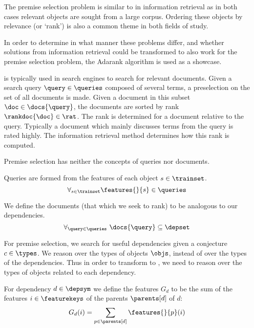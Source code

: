 The premise selection problem is similar to \ltr in information retrieval
as in both cases relevant objects are sought from a large corpus.
Ordering these objects by relevance (or `rank') is also a common theme in both fields of study.

In order to determine in what manner these problems differ, and whether solutions
from information retrieval could be transformed to also work for the premise selection problem,
the Adarank algorithm \cite{xu2007adarank} is used as a showcase.

\ltr is typically used in search engines to search for relevant documents.
Given a search query $\query \in \queries$ composed of several terms, a preselection on the set of
all documents is made. Given a document in this subset $\doc \in \docs{\query}$,
the documents are sorted by rank $\rankdoc{\doc} \in \rat$.
The rank is determined for a document relative to the query.
Typically a document which mainly discusses terms from the query is rated highly.
The information retrieval method determines how this rank is computed.

Premise selection has neither the concepts of queries nor documents.

\begin{definition}
  Queries are formed from the features of each object $s \in \trainset$.
  \[
    \forall_{s \in \trainset} \features{}{s} \in \queries
  \]
\end{definition}

\begin{definition}
  We define the documents (that which we seek to rank) to be analogous to our dependencies.
  \[
    \forall_{\query \in \queries}~ \docs{\query} \subseteq \depset
  \]
\end{definition}

For premise selection, we search for useful dependencies given a conjecture $c \in \types$.
We reason over the types of objects $\objs$, instead of over the types of the dependencies.
Thus in order to transform to \ltr, we need to reason over the types of objects related to each dependency.

\begin{definition}
  For dependency $d \in \depsym$ we define the features $G_d$ to be the sum of
  the features $i \in \featurekeys$ of the parents $\parents[d]$ of $d$:
  \[
    G_d(i) = \sum_{p \in \parents[d]} \features{}{p}(i)
  \]
\end{definition}

